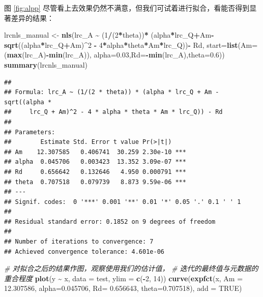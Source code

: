 \documentclass[
]{krantz}
\makeatletter
\newenvironment{Shaded}{\begin{snugshade}}{\end{snugshade}}
\newcommand{\CommentTok}[1]{\textcolor[rgb]{0.56,0.35,0.01}{\textit{#1}}}
\newcommand{\DataTypeTok}[1]{\textcolor[rgb]{0.13,0.29,0.53}{#1}}
\newcommand{\DecValTok}[1]{\textcolor[rgb]{0.00,0.00,0.81}{#1}}
\newcommand{\FloatTok}[1]{\textcolor[rgb]{0.00,0.00,0.81}{#1}}
\newcommand{\KeywordTok}[1]{\textcolor[rgb]{0.13,0.29,0.53}{\textbf{#1}}}
\newcommand{\NormalTok}[1]{#1}
\newcommand{\OperatorTok}[1]{\textcolor[rgb]{0.81,0.36,0.00}{\textbf{#1}}}
\newcommand{\OtherTok}[1]{\textcolor[rgb]{0.56,0.35,0.01}{#1}}
\newcommand{\StringTok}[1]{\textcolor[rgb]{0.31,0.60,0.02}{#1}}
\newenvironment{kframe}{%
\medskip{}
\setlength{\fboxsep}{.8em}
 \def\at@end@of@kframe{}%
 \ifinner\ifhmode%
  \def\at@end@of@kframe{\end{minipage}}%
  \begin{minipage}{\columnwidth}%
 \fi\fi%
 \def\FrameCommand##1{\hskip\@totalleftmargin \hskip-\fboxsep
 \colorbox{shadecolor}{##1}\hskip-\fboxsep
     \hskip-\linewidth \hskip-\@totalleftmargin \hskip\columnwidth}%
 \MakeFramed {\advance\hsize-\width
   \@totalleftmargin\z@ \linewidth\hsize
   \@setminipage}}%
 {\par\unskip\endMakeFramed%
 \at@end@of@kframe}
\renewenvironment{Shaded}{\begin{kframe}}{\end{kframe}}
\makeatother
\begin{document}
图 \ref{fig:alpp} 尽管看上去效果仍然不满意，但我们可试着进行拟合，看能否得到显著差异的结果：

\begin{Shaded}
\begin{Highlighting}[]
\NormalTok{lrcnls\_manual \textless{}{-}}\StringTok{ }\KeywordTok{nls}\NormalTok{(lrc\_A }\OperatorTok{\textasciitilde{}}\StringTok{ }
\StringTok{        }\NormalTok{(}\DecValTok{1}\OperatorTok{/}\NormalTok{(}\DecValTok{2}\OperatorTok{*}\NormalTok{theta))}\OperatorTok{*}
\StringTok{        }\NormalTok{(alpha}\OperatorTok{*}\NormalTok{lrc\_Q}\OperatorTok{+}\NormalTok{Am}\OperatorTok{{-}}\KeywordTok{sqrt}\NormalTok{((alpha}\OperatorTok{*}\NormalTok{lrc\_Q}\OperatorTok{+}\NormalTok{Am)}\OperatorTok{\^{}}\DecValTok{2} \OperatorTok{{-}}\StringTok{ }
\StringTok{                               }\DecValTok{4}\OperatorTok{*}\NormalTok{alpha}\OperatorTok{*}\NormalTok{theta}\OperatorTok{*}\NormalTok{Am}\OperatorTok{*}\NormalTok{lrc\_Q))}\OperatorTok{{-}}\StringTok{ }
\StringTok{        }\NormalTok{Rd, }\DataTypeTok{start=}\KeywordTok{list}\NormalTok{(}\DataTypeTok{Am=}\NormalTok{(}\KeywordTok{max}\NormalTok{(lrc\_A)}\OperatorTok{{-}}\KeywordTok{min}\NormalTok{(lrc\_A)),}
                       \DataTypeTok{alpha=}\FloatTok{0.03}\NormalTok{,}\DataTypeTok{Rd=}\OperatorTok{{-}}\KeywordTok{min}\NormalTok{(lrc\_A),}\DataTypeTok{theta=}\FloatTok{0.6}\NormalTok{))}
\KeywordTok{summary}\NormalTok{(lrcnls\_manual)}
\end{Highlighting}
\end{Shaded}

\begin{verbatim}
## 
## Formula: lrc_A ~ (1/(2 * theta)) * (alpha * lrc_Q + Am - sqrt((alpha * 
##     lrc_Q + Am)^2 - 4 * alpha * theta * Am * lrc_Q)) - Rd
## 
## Parameters:
##        Estimate Std. Error t value Pr(>|t|)    
## Am    12.307585   0.406741  30.259 2.30e-10 ***
## alpha  0.045706   0.003423  13.352 3.09e-07 ***
## Rd     0.656642   0.132646   4.950 0.000791 ***
## theta  0.707518   0.079739   8.873 9.59e-06 ***
## ---
## Signif. codes:  0 '***' 0.001 '**' 0.01 '*' 0.05 '.' 0.1 ' ' 1
## 
## Residual standard error: 0.1852 on 9 degrees of freedom
## 
## Number of iterations to convergence: 7 
## Achieved convergence tolerance: 4.601e-06
\end{verbatim}

\begin{Shaded}
\begin{Highlighting}[]
\CommentTok{\# 对拟合之后的结果作图，观察使用我们的估计值，}
\CommentTok{\# 迭代的最终值与元数据的重合程度}
\KeywordTok{plot}\NormalTok{(y }\OperatorTok{\textasciitilde{}}\StringTok{ }\NormalTok{x, }\DataTypeTok{data =}\NormalTok{ test, }\DataTypeTok{ylim =} \KeywordTok{c}\NormalTok{(}\OperatorTok{{-}}\DecValTok{2}\NormalTok{, }\DecValTok{14}\NormalTok{))}
\KeywordTok{curve}\NormalTok{(}\KeywordTok{expfct}\NormalTok{(x, }\DataTypeTok{Am =} \FloatTok{12.307586}\NormalTok{,}
     \DataTypeTok{alpha=}\FloatTok{0.045706}\NormalTok{, }\DataTypeTok{Rd=} \FloatTok{0.656643}\NormalTok{, }\DataTypeTok{theta=}\FloatTok{0.707518}\NormalTok{), }\DataTypeTok{add =} \OtherTok{TRUE}\NormalTok{)}
\end{Highlighting}
\end{Shaded}
\end{document}
